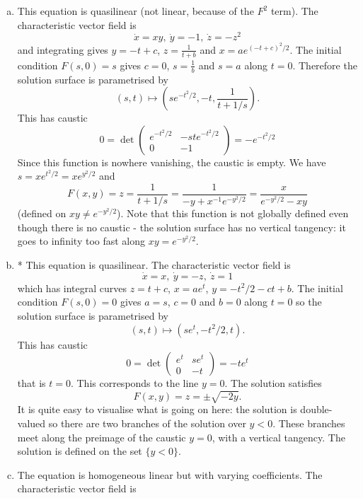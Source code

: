 \documentclass[12pt]{article}
\begin{document}
\begin{answer}
\begin{enumerate}[(a)]
\[\begin{array}{cc}
(1+t)e^t & s(2+t)e^{t}\\
0 & 1
\end{array}\right)=0\]
that is
\[(1+t)e^t=0\]
i.e.
\[t=-1\]
The caustic is therefore the point $y=-1$, $x=0$ (just substituting $t=-1$ into the parametric surface). Note that $z=se^t=se^y$ and $s=xe^{-y}/(1+y)$ so
\[F(x,y)=\frac{x}{1+y}\]
is the solution (defined away from $y=-1$).
\item This equation is quasilinear (not linear, because of the $F^2$ term). The characteristic vector field is
\[\dot{x}=xy,\ \dot{y}=-1,\ \dot{z}=-z^2\]
and integrating gives $y=-t+c$, $z=\frac{1}{t+b}$ and $x=ae^{(-t+c)^2/2}$. The initial condition $F(s,0)=s$ gives $c=0$, $s=\frac{1}{b}$ and $s=a$ along $t=0$. Therefore the solution surface is parametrised by
\[(s,t)\mapsto \left(se^{-t^2/2},-t,\frac{1}{t+1/s}\right).\]
This has caustic
\[0=\det\left(\begin{array}{cc}
e^{-t^2/2} & -ste^{-t^2/2}\\
0 & -1
\end{array}\right)=-e^{-t^2/2}\]
Since this function is nowhere vanishing, the caustic is empty. We have $s=xe^{t^2/2}=xe^{y^2/2}$ and
\[F(x,y)=z=\frac{1}{t+1/s}=\frac{1}{-y+x^{-1}e^{-y^2/2}}=\frac{x}{e^{-y^2/2}-xy}\]
(defined on $xy\neq e^{-y^2/2}$). Note that this function is not globally defined even though there is no caustic - the solution surface has no vertical tangency: it goes to infinity too fast along $xy=e^{-y^2/2}$.
\item * This equation is quasilinear. The characteristic vector field is
\[\dot{x}=x,\ \dot{y}=-z,\ \dot{z}=1\]
which has integral curves $z=t+c$, $x=ae^t$, $y=-t^2/2-ct+b$.
The initial condition $F(s,0)=0$ gives $a=s$, $c=0$ and $b=0$ along $t=0$ so the solution surface is parametrised by
\[(s,t)\mapsto (se^t,-t^2/2,t).\]
This has caustic
\[0=\det\left(\begin{array}{cc}
e^t & se^t\\
0 & -t
\end{array}\right)=-te^t\]
that is $t=0$.
This corresponds to the line $y=0$. The solution satisfies
\[F(x,y)=z=\pm\sqrt{-2y}.\]
It is quite easy to visualise what is going on here: the solution is double-valued so there are two branches of the solution over $y<0$. These branches meet along the preimage of the caustic $y=0$, with a vertical tangency. The solution is defined on the set $\{y<0\}$.
\item The equation is homogeneous linear but with varying coefficients. The characteristic vector field is

\end{enumerate}
\end{answer}
\end{document}
